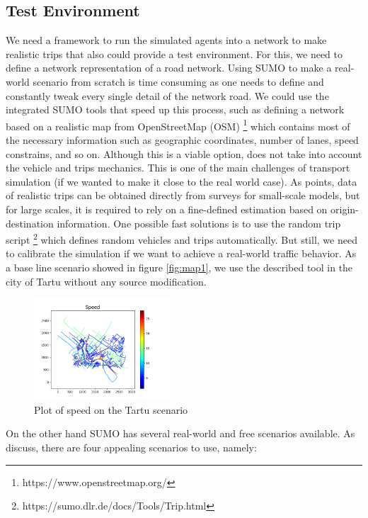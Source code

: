 \documentclass[letter, 10pt, conference]{ieeeconf}
\begin{document}
\subsection{Test Environment}

We need a framework to run the simulated agents into a network to make realistic trips that also could provide a test environment.
For this, we need to define a network representation of a road network.
Using SUMO to make a real-world scenario from scratch is time consuming as one needs to define and constantly tweak every single detail of the network road.
We could use the integrated SUMO tools that speed up this process, such as defining a network based on a realistic map from OpenStreetMap (OSM) \footnote{https://www.openstreetmap.org/} which contains most of the necessary information such as geographic coordinates, number of lanes, speed constrains, and so on.
Although this is a viable option, does not take into account the vehicle and trips mechanics.
This is one of the main challenges of transport simulation (if we wanted to make it close to the real world case).
As \cite{hofer_large_2018} points, data of realistic trips can be obtained directly from surveys for small-scale models, but for large scales, it is required to rely on a fine-defined estimation based on origin-destination information.
One possible fast solutions is to use the random trip script \footnote{https://sumo.dlr.de/docs/Tools/Trip.html} which defines random vehicles and trips automatically.
But still, we need to calibrate the simulation if we want to achieve a real-world traffic behavior.
As a base line scenario showed in figure \ref{fig:map1}, we use the described tool in the city of Tartu without any source modification.

\begin{figure}[h]
  \centering
  \includegraphics[width=0.45\textwidth]{map_speeds_tartu_1}
  \caption{Plot of speed on the Tartu scenario}
  \label{fig:map_speeds_tartu_1}
\end{figure}

On the other hand SUMO has several real-world and free scenarios available.
As \cite{heisig_bridging_nodate} discuss, there are four appealing scenarios to use, namely:
\end{document}

